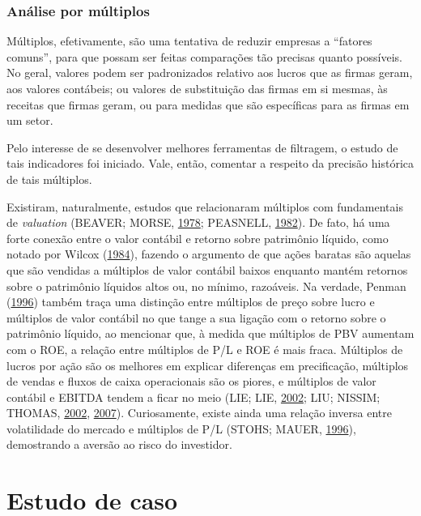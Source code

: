 \documentclass[aprovado,numbers]{coppe}
\begin{document}
  \hypertarget{anuxe1lise-por-muxfaltiplos}{%
  \subsection{Análise por múltiplos}\label{anuxe1lise-por-muxfaltiplos}}

  Múltiplos, efetivamente, são uma tentativa de reduzir empresas a ``fatores comuns'', para que possam ser feitas comparações tão precisas quanto possíveis. No geral, valores podem ser padronizados relativo aos lucros que as firmas geram, aos valores contábeis; ou valores de substituição das firmas em si mesmas, às receitas que firmas geram, ou para medidas que são específicas para as firmas em um setor.

  Pelo interesse de se desenvolver melhores ferramentas de filtragem, o estudo de tais indicadores foi iniciado. Vale, então, comentar a respeito da precisão histórica de tais múltiplos.

  Existiram, naturalmente, estudos que relacionaram múltiplos com fundamentais de \emph{valuation} (BEAVER; MORSE, \protect\hyperlink{ref-beaver1978}{1978}; PEASNELL, \protect\hyperlink{ref-peasnell1982}{1982}). De fato, há uma forte conexão entre o valor contábil e retorno sobre patrimônio líquido, como notado por Wilcox (\protect\hyperlink{ref-wilcox1984}{1984}), fazendo o argumento de que ações baratas são aquelas que são vendidas a múltiplos de valor contábil baixos enquanto mantém retornos sobre o patrimônio líquidos altos ou, no mínimo, razoáveis. Na verdade, Penman (\protect\hyperlink{ref-penman1996}{1996}) também traça uma distinção entre múltiplos de preço sobre lucro e múltiplos de valor contábil no que tange a sua ligação com o retorno sobre o patrimônio líquido, ao mencionar que, à medida que múltiplos de PBV aumentam com o ROE, a relação entre múltiplos de P/L e ROE é mais fraca. Múltiplos de lucros por ação são os melhores em explicar diferenças em precificação, múltiplos de vendas e fluxos de caixa operacionais são os piores, e múltiplos de valor contábil e EBITDA tendem a ficar no meio (LIE; LIE, \protect\hyperlink{ref-lie2002}{2002}; LIU; NISSIM; THOMAS, \protect\hyperlink{ref-liu2002}{2002}, \protect\hyperlink{ref-liu2007}{2007}). Curiosamente, existe ainda uma relação inversa entre volatilidade do mercado e múltiplos de P/L (STOHS; MAUER, \protect\hyperlink{ref-stohs1996}{1996}), demostrando a aversão ao risco do investidor.

  \hypertarget{estudo-de-caso}{%
  \chapter{Estudo de caso}\label{estudo-de-caso}}
\end{document}
